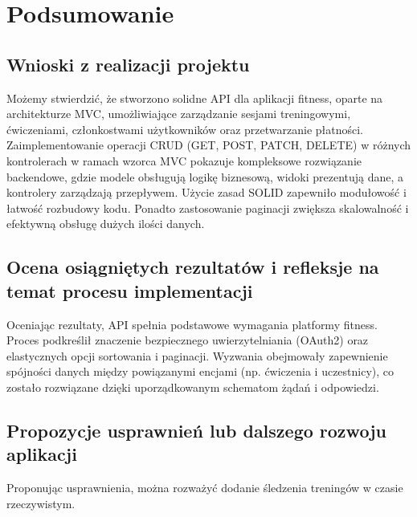\documentclass[../../spr.tex]{subfiles}
\begin{document}
\section{Podsumowanie}

\subsection{Wnioski z realizacji projektu}
Możemy stwierdzić, że stworzono solidne API dla aplikacji fitness,
oparte na architekturze MVC, umożliwiające zarządzanie sesjami treningowymi,
ćwiczeniami, członkostwami użytkowników oraz przetwarzanie płatności.
Zaimplementowanie operacji CRUD (GET, POST, PATCH, DELETE) w różnych kontrolerach
w ramach wzorca MVC pokazuje kompleksowe rozwiązanie backendowe,
gdzie modele obsługują logikę biznesową, widoki prezentują dane,
a kontrolery zarządzają przepływem. Użycie zasad SOLID
zapewniło modułowość i łatwość rozbudowy kodu.
Ponadto zastosowanie paginacji zwiększa skalowalność i efektywną obsługę dużych ilości danych.

\subsection{Ocena osiągniętych rezultatów i refleksje na temat procesu implementacji}
Oceniając rezultaty, API spełnia podstawowe wymagania platformy fitness.
Proces podkreślił znaczenie bezpiecznego uwierzytelniania (OAuth2) oraz elastycznych opcji sortowania i paginacji.
Wyzwania obejmowały zapewnienie spójności danych między powiązanymi encjami (np. ćwiczenia i uczestnicy),
co zostało rozwiązane dzięki uporządkowanym schematom żądań i odpowiedzi.

\subsection{Propozycje usprawnień lub dalszego rozwoju aplikacji}
Proponując usprawnienia, można rozważyć dodanie śledzenia treningów w czasie rzeczywistym.
\end{document}
